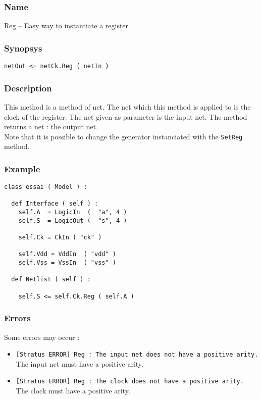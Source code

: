 \subsubsection{Name}

Reg -- Easy way to instantiate a register

\subsubsection{Synopsys}

\begin{verbatim}
netOut <= netCk.Reg ( netIn )
\end{verbatim}
  
\subsubsection{Description}

This method is a method of net. The net which this method is applied to is the clock of the register. The net given as parameter is the input net. The method returns a net : the output net.\\
\indent Note that it is possible to change the generator instanciated with the \verb-SetReg- method.

\subsubsection{Example}

\begin{verbatim}
class essai ( Model ) :

  def Interface ( self ) :
    self.A  = LogicIn  (  "a", 4 )
    self.S  = LogicOut (  "s", 4 )

    self.Ck = CkIn ( "ck" )
    
    self.Vdd = VddIn  ( "vdd" )
    self.Vss = VssIn  ( "vss" )
	
  def Netlist ( self ) :

    self.S <= self.Ck.Reg ( self.A ) 
\end{verbatim}
    
\subsubsection{Errors}
    
Some errors may occur :
\begin{itemize}
    \item \verb-[Stratus ERROR] Reg : The input net does not have a positive arity.-\\The input net must have a positive arity.
    \item \verb-[Stratus ERROR] Reg : The clock does not have a positive arity.-\\The clock must have a positive arity.
\end{itemize}

